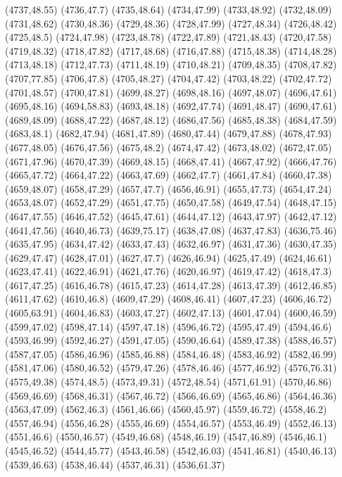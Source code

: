 (4737,48.55)
(4736,47.7)
(4735,48.64)
(4734,47.99)
(4733,48.92)
(4732,48.09)
(4731,48.62)
(4730,48.36)
(4729,48.36)
(4728,47.99)
(4727,48.34)
(4726,48.42)
(4725,48.5)
(4724,47.98)
(4723,48.78)
(4722,47.89)
(4721,48.43)
(4720,47.58)
(4719,48.32)
(4718,47.82)
(4717,48.68)
(4716,47.88)
(4715,48.38)
(4714,48.28)
(4713,48.18)
(4712,47.73)
(4711,48.19)
(4710,48.21)
(4709,48.35)
(4708,47.82)
(4707,77.85)
(4706,47.8)
(4705,48.27)
(4704,47.42)
(4703,48.22)
(4702,47.72)
(4701,48.57)
(4700,47.81)
(4699,48.27)
(4698,48.16)
(4697,48.07)
(4696,47.61)
(4695,48.16)
(4694,58.83)
(4693,48.18)
(4692,47.74)
(4691,48.47)
(4690,47.61)
(4689,48.09)
(4688,47.22)
(4687,48.12)
(4686,47.56)
(4685,48.38)
(4684,47.59)
(4683,48.1)
(4682,47.94)
(4681,47.89)
(4680,47.44)
(4679,47.88)
(4678,47.93)
(4677,48.05)
(4676,47.56)
(4675,48.2)
(4674,47.42)
(4673,48.02)
(4672,47.05)
(4671,47.96)
(4670,47.39)
(4669,48.15)
(4668,47.41)
(4667,47.92)
(4666,47.76)
(4665,47.72)
(4664,47.22)
(4663,47.69)
(4662,47.7)
(4661,47.84)
(4660,47.38)
(4659,48.07)
(4658,47.29)
(4657,47.7)
(4656,46.91)
(4655,47.73)
(4654,47.24)
(4653,48.07)
(4652,47.29)
(4651,47.75)
(4650,47.58)
(4649,47.54)
(4648,47.15)
(4647,47.55)
(4646,47.52)
(4645,47.61)
(4644,47.12)
(4643,47.97)
(4642,47.12)
(4641,47.56)
(4640,46.73)
(4639,75.17)
(4638,47.08)
(4637,47.83)
(4636,75.46)
(4635,47.95)
(4634,47.42)
(4633,47.43)
(4632,46.97)
(4631,47.36)
(4630,47.35)
(4629,47.47)
(4628,47.01)
(4627,47.7)
(4626,46.94)
(4625,47.49)
(4624,46.61)
(4623,47.41)
(4622,46.91)
(4621,47.76)
(4620,46.97)
(4619,47.42)
(4618,47.3)
(4617,47.25)
(4616,46.78)
(4615,47.23)
(4614,47.28)
(4613,47.39)
(4612,46.85)
(4611,47.62)
(4610,46.8)
(4609,47.29)
(4608,46.41)
(4607,47.23)
(4606,46.72)
(4605,63.91)
(4604,46.83)
(4603,47.27)
(4602,47.13)
(4601,47.04)
(4600,46.59)
(4599,47.02)
(4598,47.14)
(4597,47.18)
(4596,46.72)
(4595,47.49)
(4594,46.6)
(4593,46.99)
(4592,46.27)
(4591,47.05)
(4590,46.64)
(4589,47.38)
(4588,46.57)
(4587,47.05)
(4586,46.96)
(4585,46.88)
(4584,46.48)
(4583,46.92)
(4582,46.99)
(4581,47.06)
(4580,46.52)
(4579,47.26)
(4578,46.46)
(4577,46.92)
(4576,76.31)
(4575,49.38)
(4574,48.5)
(4573,49.31)
(4572,48.54)
(4571,61.91)
(4570,46.86)
(4569,46.69)
(4568,46.31)
(4567,46.72)
(4566,46.69)
(4565,46.86)
(4564,46.36)
(4563,47.09)
(4562,46.3)
(4561,46.66)
(4560,45.97)
(4559,46.72)
(4558,46.2)
(4557,46.94)
(4556,46.28)
(4555,46.69)
(4554,46.57)
(4553,46.49)
(4552,46.13)
(4551,46.6)
(4550,46.57)
(4549,46.68)
(4548,46.19)
(4547,46.89)
(4546,46.1)
(4545,46.52)
(4544,45.77)
(4543,46.58)
(4542,46.03)
(4541,46.81)
(4540,46.13)
(4539,46.63)
(4538,46.44)
(4537,46.31)
(4536,61.37)
